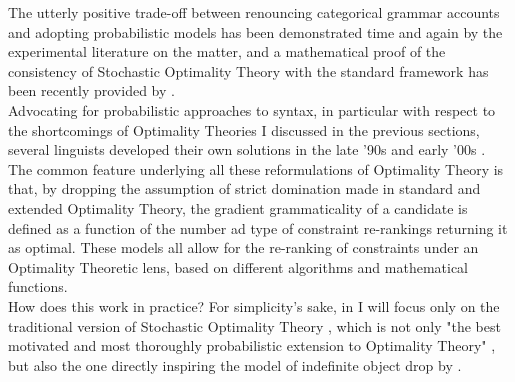 The utterly positive trade-off between renouncing categorical grammar accounts and adopting probabilistic models has been demonstrated time and again by the experimental literature on the matter, and a mathematical proof of the consistency of Stochastic Optimality Theory with the standard framework has been recently provided by \textcite{magri2018implicational}. \\
Advocating for probabilistic approaches to syntax, in particular with respect to the shortcomings of Optimality Theories I discussed in the previous sections, several linguists developed their own solutions in the late '90s and early '00s \parencite{Boersma2004, SoraceKeller2005, Keller2000, Keller2006, AlexopoulouKeller2006, BoersmaHayes2001empirical, keller1998gradient, davidson2003tense}. The common feature underlying all these reformulations of Optimality Theory is that, by dropping the assumption of strict domination made in standard and extended Optimality Theory, the gradient grammaticality of a candidate is defined as a function of the number ad type of constraint re-rankings returning it as optimal. These models all allow for the re-ranking of constraints under an Optimality Theoretic lens, based on different algorithms and mathematical functions.\\
How does this work in practice? For simplicity's sake, in  I will focus only on the traditional version of Stochastic Optimality Theory \parencite{boersma1997we, BoersmaHayes2001empirical}, which is not only "the best motivated and most thoroughly probabilistic extension to Optimality Theory" \parencite[25]{manning2003probabilistic}, but also the one directly inspiring the model of indefinite object drop by \textcite{Medina2007}.


